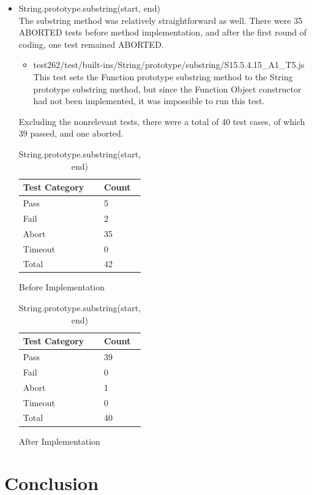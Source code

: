 \documentclass[a4paper,11pt,twoside]{report}
\begin{document}
\begin{itemize}
\item String.prototype.substring(start, end) \\
The substring method was relatively straightforward as well. There were 35 ABORTED tests before method implementation, and after the first round of coding, one test remained ABORTED. 
\begin{itemize}
\item test262/test/built-ins/String/prototype/substring/S15.5.4.15\_A1\_T5.js \\
This test sets the Function prototype substring method to the String prototype substring method, but since the Function Object constructor had not been implemented, it was impossible to run this test.
\end{itemize}
Excluding the nonrelevant tests, there were a total of 40 test cases, of which 39 passed, and one aborted.
\begin{table}[ht!]
\centering
\begin{subtable}{0.5\textwidth}
\centering
\begin{tabular}{|p{3cm}|p{2cm}|} \hline
\textbf{Test Category} & \textbf{Count} \\ \hline
Pass & 5 \\
Fail & 2 \\
Abort & 35 \\
Timeout & 0 \\
Total & 42 \\ \hline
\end{tabular}
\caption{Before Implementation}
\end{subtable}%
\begin{subtable}{0.5\textwidth}
\centering
\begin{tabular}{|p{3cm}|p{2cm}|} \hline
\textbf{Test Category} & \textbf{Count} \\ \hline
Pass & 39 \\
Fail & 0 \\
Abort & 1 \\
Timeout & 0 \\
Total & 40 \\ \hline
\end{tabular}
\caption{After Implementation}
\end{subtable}
\caption{String.prototype.substring(start, end)}
\end{table}

\end{itemize}






\chapter*{Conclusion}




\end{document}
